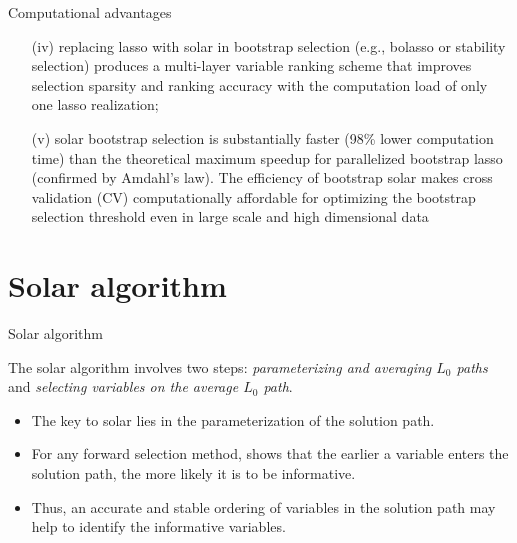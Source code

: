 \documentclass{beamer}
\begin{document}
\begin{frame}{Computational advantages}
  \begin{itemize}  
    \item  [(iv)] replacing lasso with solar in bootstrap selection (e.g., bolasso or stability selection) produces a multi-layer variable ranking scheme that improves selection sparsity and ranking accuracy with the computation load of only one lasso realization; 
    
    \item  [(v)]  solar bootstrap selection is substantially faster (98\% lower computation time) than the theoretical maximum speedup for parallelized bootstrap lasso (confirmed by Amdahl's law). The efficiency of bootstrap solar makes cross validation (CV) computationally affordable for optimizing the bootstrap selection threshold even in large scale and high dimensional data
  \end{itemize}
\end{frame}



\section{Solar algorithm}

\begin{frame}{Solar algorithm}

  The solar algorithm involves two steps: \emph{parameterizing and averaging $L_0$ paths} and \emph{selecting variables on the average $L_0$ path}.
  
  \begin{itemize}  
    \item The key to solar lies in the parameterization of the solution path. 
    \item For any forward selection method, \citet[Theorem~2]{zhang09} shows that the earlier a variable enters the solution path, the more likely it is to be informative. 
    \item Thus, an accurate and stable ordering of variables in the solution path may help to identify the informative variables.
  \end{itemize}

\end{frame}
\end{document}
